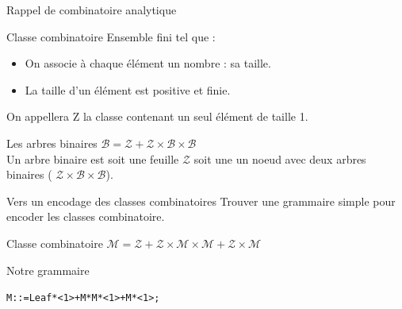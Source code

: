\documentclass{beamer}
\begin{document}
\begin{frame}{Rappel de combinatoire analytique}
\begin{block}{Classe combinatoire}
Ensemble fini tel que : \\
\begin{itemize}
\item  On associe à chaque élément un nombre : sa taille.
\item La taille d'un élément est positive et finie.
\end{itemize}

On appellera Z la classe contenant un seul élément de taille 1.
\end{block}
\begin{exampleblock}{Les arbres binaires}
$\mathcal{B} = \mathcal{Z} + \mathcal{Z} \times \mathcal{B} \times \mathcal{B}$ \\
Un arbre binaire est soit une feuille $\mathcal{Z}$ soit une un noeud avec deux arbres binaires ( $\mathcal{Z} \times \mathcal{B} \times \mathcal{B}$).
\end{exampleblock}
\end{frame}



\begin{frame}{Vers un encodage des classes combinatoires }
Trouver une grammaire simple pour encoder les classes combinatoire. \newline
\begin{block}{Classe combinatoire}
\center
$\mathcal{M} = \mathcal{Z} + \mathcal{Z} \times \mathcal{M} \times \mathcal{M} + \mathcal{Z} \times \mathcal{M}$ \\  %
\end{block}
\vspace{0.5cm}
\begin{block}{Notre grammaire}
\begin{alltt}
\center
M ::= Leaf * <1> + M * M * <1> + M * <1>;
\end{alltt}
\end{block}
\end{frame}
\end{document}
